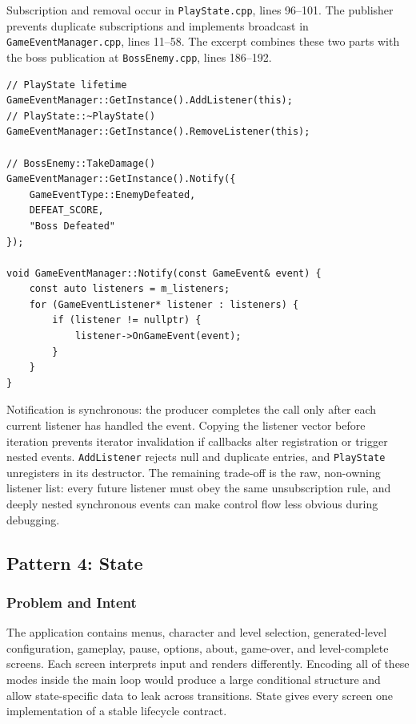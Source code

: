 \documentclass{template}
\begin{document}
Subscription and removal occur in \texttt{PlayState.cpp}, lines 96--101. The
publisher prevents duplicate subscriptions and implements broadcast in
\texttt{GameEventManager.cpp}, lines 11--58. The excerpt combines these two
parts with the boss publication at \texttt{BossEnemy.cpp}, lines 186--192.

\begin{lstlisting}[style=gamecode,basicstyle=\ttfamily\scriptsize,caption={Observer registration, publication, and notification.}]
// PlayState lifetime
GameEventManager::GetInstance().AddListener(this);
// PlayState::~PlayState()
GameEventManager::GetInstance().RemoveListener(this);

// BossEnemy::TakeDamage()
GameEventManager::GetInstance().Notify({
    GameEventType::EnemyDefeated,
    DEFEAT_SCORE,
    "Boss Defeated"
});

void GameEventManager::Notify(const GameEvent& event) {
    const auto listeners = m_listeners;
    for (GameEventListener* listener : listeners) {
        if (listener != nullptr) {
            listener->OnGameEvent(event);
        }
    }
}
\end{lstlisting}

Notification is synchronous: the producer completes the call only after each
current listener has handled the event. Copying the listener vector before
iteration prevents iterator invalidation if callbacks alter registration or
trigger nested events. \texttt{AddListener} rejects null and duplicate entries,
and \texttt{PlayState} unregisters in its destructor. The remaining trade-off
is the raw, non-owning listener list: every future listener must obey the same
unsubscription rule, and deeply nested synchronous events can make control flow
less obvious during debugging.

\subsection{Pattern 4: State}

\subsubsection{Problem and Intent}

The application contains menus, character and level selection, generated-level
configuration, gameplay, pause, options, about, game-over, and level-complete
screens. Each screen interprets input and renders differently. Encoding all of
these modes inside the main loop would produce a large conditional structure
and allow state-specific data to leak across transitions. State gives every
screen one implementation of a stable lifecycle contract.
\end{document}
